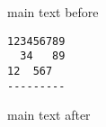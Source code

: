 \documentclass{article}
\begin{document}
main text before
\begin{lstlisting}
123456789
  34   89
12  567
---------
\end{lstlisting}
main text after
\end{document}
